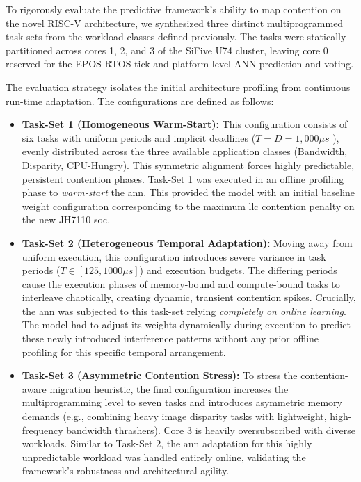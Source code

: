 \documentclass[conference]{IEEEtran}
\begin{document}
To rigorously evaluate the predictive framework's ability to map contention on the novel RISC-V architecture, we synthesized three distinct multiprogrammed task-sets from the workload classes defined previously. The tasks were statically partitioned across cores 1, 2, and 3 of the SiFive U74 cluster, leaving core 0 reserved for the EPOS RTOS tick and platform-level ANN prediction and voting.

The evaluation strategy isolates the initial architecture profiling from continuous run-time adaptation. The configurations are defined as follows:

\begin{itemize}
    \item \textbf{Task-Set 1 (Homogeneous Warm-Start):} This configuration consists of six tasks with uniform periods and implicit deadlines ($T = D = 1,000 \mu s$ ), evenly distributed across the three available application classes (Bandwidth, Disparity, CPU-Hungry). This symmetric alignment forces highly predictable, persistent contention phases. Task-Set 1 was executed in an offline profiling phase to \textit{warm-start} the \gls{ann}. This provided the model with an initial baseline weight configuration corresponding to the maximum \gls{llc} contention penalty on the new JH7110 \gls{soc}.
    
    \item \textbf{Task-Set 2 (Heterogeneous Temporal Adaptation):} Moving away from uniform execution, this configuration introduces severe variance in task periods ($T \in [125, 1000\mu s]$) and execution budgets. The differing periods cause the execution phases of memory-bound and compute-bound tasks to interleave chaotically, creating dynamic, transient contention spikes. Crucially, the \gls{ann} was subjected to this task-set relying \textit{completely on online learning}. The model had to adjust its weights dynamically during execution to predict these newly introduced interference patterns without any prior offline profiling for this specific temporal arrangement.
    
    \item \textbf{Task-Set 3 (Asymmetric Contention Stress):} To stress the contention-aware migration heuristic, the final configuration increases the multiprogramming level to seven tasks and introduces asymmetric memory demands (e.g., combining heavy image disparity tasks with lightweight, high-frequency bandwidth thrashers). Core 3 is heavily oversubscribed with diverse workloads. Similar to Task-Set 2, the \gls{ann} adaptation for this highly unpredictable workload was handled entirely online, validating the framework's robustness and architectural agility.
\end{itemize}
\end{document}

